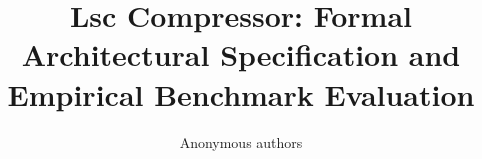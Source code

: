 \title{\textbf{Lsc Compressor: Formal Architectural Specification and Empirical Benchmark Evaluation}}

\author{Anonymous authors}
